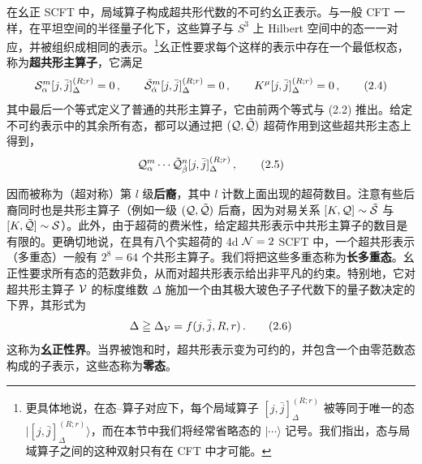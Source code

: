 在幺正 SCFT 中，局域算子构成超共形代数的不可约幺正表示。与一般 CFT 一样，在平坦空间的半径量子化下，这些算子与 $S^3$ 上 Hilbert 空间中的态一一对应，并被组织成相同的表示。\footnote{更具体地说，在态--算子对应下，每个局域算子 $[j,\bar j]^{(R;r)}_\Delta$ 被等同于唯一的态 $|[j,\bar j]^{(R;r)}_\Delta\rangle$，而在本节中我们将经常省略态的 $|\cdots\rangle$ 记号。我们指出，态与局域算子之间的这种双射只有在 CFT 中才可能。}幺正性要求每个这样的表示中存在一个最低权态，称为\textbf{超共形主算子}，它满足
\begin{equation}
  \mathcal{S}^m_\alpha[j,\bar j]^{(R;r)}_\Delta=0\,,\qquad
  \tilde{\mathcal{S}}^m_{\dot\alpha}[j,\bar j]^{(R;r)}_\Delta=0\,,\qquad
  K^\mu[j,\bar j]^{(R;r)}_\Delta=0\,,
  \tag{2.4}
\end{equation}
其中最后一个等式定义了普通的共形主算子，它由前两个等式与 (2.2) 推出。给定不可约表示中的其余所有态，都可以通过把 $(\mathcal{Q},\tilde{\mathcal{Q}})$ 超荷作用到这些超共形主态上得到，
\begin{equation}
  \mathcal{Q}^m_\alpha\cdots\tilde{\mathcal{Q}}^n_{\dot\beta}[j,\bar j]^{(R;r)}_\Delta\,,
  \tag{2.5}
\end{equation}

因而被称为（超对称）第 $l$ 级\textbf{后裔}，其中 $l$ 计数上面出现的超荷数目。注意有些后裔同时也是共形主算子（例如一级 $(\mathcal{Q},\tilde{\mathcal{Q}})$ 后裔，因为对易关系 $[K,\mathcal{Q}]\sim\tilde{\mathcal{S}}$ 与 $[K,\tilde{\mathcal{Q}}]\sim\mathcal{S}$）。此外，由于超荷的费米性，给定超共形表示中共形主算子的数目是有限的。更确切地说，在具有八个实超荷的 4d $\mathcal{N}=2$ SCFT 中，一个超共形表示（多重态）一般有 $2^8=64$ 个共形主算子。我们将把这些多重态称为\textbf{长多重态}。幺正性要求所有态的范数非负，从而对超共形表示给出非平凡的约束。特别地，它对超共形主算子 $\mathcal{V}$ 的标度维数 $\Delta$ 施加一个由其极大玻色子子代数下的量子数决定的下界，其形式为
\begin{equation}
  \Delta\geqq\Delta_{\mathcal{V}}=f(j,\bar j,R,r)\,.
  \tag{2.6}
\end{equation}
这称为\textbf{幺正性界}。当界被饱和时，超共形表示变为可约的，并包含一个由零范数态构成的子表示，这些态称为\textbf{零态}。

